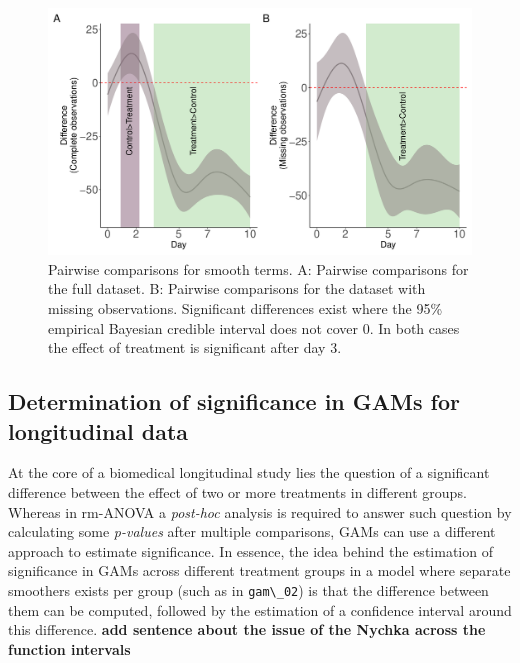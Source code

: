 \documentclass[
]{article}
\newcommand{\passthrough}[1]{#1}
\begin{document}
\begin{figure}

{\centering \includegraphics[width=1\linewidth]{Full_document_SIM_No_Appendix_files/figure-latex/plot-pairwise-comp-1} 

}

\caption{Pairwise comparisons for smooth terms. A: Pairwise comparisons for the full dataset. B: Pairwise comparisons for the dataset with missing observations. Significant differences exist where the 95\% empirical Bayesian credible interval does not cover 0. In both cases the effect of treatment is significant after day 3.}\label{fig:plot-pairwise-comp}
\end{figure}

\hypertarget{GAM-significance}{%
\subsection{Determination of significance in GAMs for longitudinal data}\label{GAM-significance}}

At the core of a biomedical longitudinal study lies the question of a significant difference between the effect of two or more treatments in different groups. Whereas in rm-ANOVA a \emph{post-hoc} analysis is required to answer such question by calculating some \emph{p-values} after multiple comparisons, GAMs can use a different approach to estimate significance. In essence, the idea behind the estimation of significance in GAMs across different treatment groups in a model where separate smoothers exists per group (such as in \passthrough{\lstinline!gam\_02!}) is that the difference between them can be computed, followed by the estimation of a confidence interval around this difference.
\textbf{add sentence about the issue of the Nychka across the function intervals }
\end{document}
